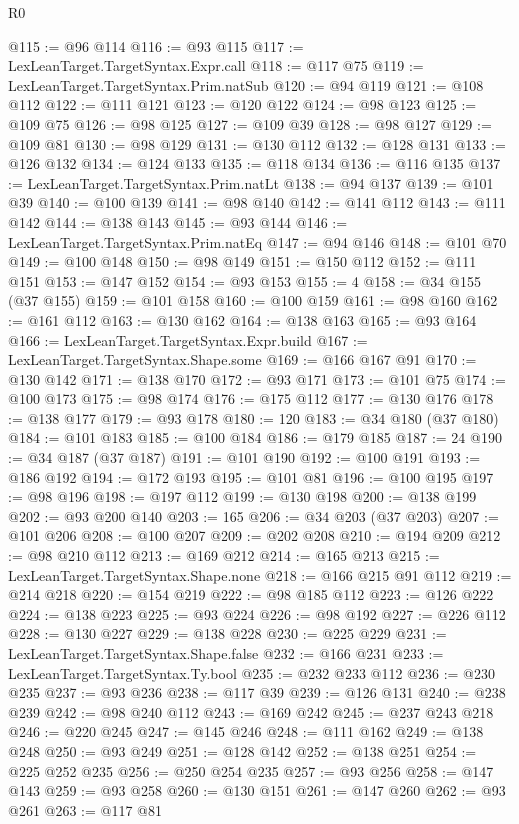 \begin{lexlean}{R0}
\begin{coremodule}
@115 := @96 @114
@116 := @93 @115
@117 := LexLeanTarget.TargetSyntax.Expr.call
@118 := @117 @75
@119 := LexLeanTarget.TargetSyntax.Prim.natSub
@120 := @94 @119
@121 := @108 @112
@122 := @111 @121
@123 := @120 @122
@124 := @98 @123
@125 := @109 @75
@126 := @98 @125
@127 := @109 @39
@128 := @98 @127
@129 := @109 @81
@130 := @98 @129
@131 := @130 @112
@132 := @128 @131
@133 := @126 @132
@134 := @124 @133
@135 := @118 @134
@136 := @116 @135
@137 := LexLeanTarget.TargetSyntax.Prim.natLt
@138 := @94 @137
@139 := @101 @39
@140 := @100 @139
@141 := @98 @140
@142 := @141 @112
@143 := @111 @142
@144 := @138 @143
@145 := @93 @144
@146 := LexLeanTarget.TargetSyntax.Prim.natEq
@147 := @94 @146
@148 := @101 @70
@149 := @100 @148
@150 := @98 @149
@151 := @150 @112
@152 := @111 @151
@153 := @147 @152
@154 := @93 @153
@155 := 4
@158 := @34 @155 (@37 @155)
@159 := @101 @158
@160 := @100 @159
@161 := @98 @160
@162 := @161 @112
@163 := @130 @162
@164 := @138 @163
@165 := @93 @164
@166 := LexLeanTarget.TargetSyntax.Expr.build
@167 := LexLeanTarget.TargetSyntax.Shape.some
@169 := @166 @167 @91
@170 := @130 @142
@171 := @138 @170
@172 := @93 @171
@173 := @101 @75
@174 := @100 @173
@175 := @98 @174
@176 := @175 @112
@177 := @130 @176
@178 := @138 @177
@179 := @93 @178
@180 := 120
@183 := @34 @180 (@37 @180)
@184 := @101 @183
@185 := @100 @184
@186 := @179 @185
@187 := 24
@190 := @34 @187 (@37 @187)
@191 := @101 @190
@192 := @100 @191
@193 := @186 @192
@194 := @172 @193
@195 := @101 @81
@196 := @100 @195
@197 := @98 @196
@198 := @197 @112
@199 := @130 @198
@200 := @138 @199
@202 := @93 @200 @140
@203 := 165
@206 := @34 @203 (@37 @203)
@207 := @101 @206
@208 := @100 @207
@209 := @202 @208
@210 := @194 @209
@212 := @98 @210 @112
@213 := @169 @212
@214 := @165 @213
@215 := LexLeanTarget.TargetSyntax.Shape.none
@218 := @166 @215 @91 @112
@219 := @214 @218
@220 := @154 @219
@222 := @98 @185 @112
@223 := @126 @222
@224 := @138 @223
@225 := @93 @224
@226 := @98 @192
@227 := @226 @112
@228 := @130 @227
@229 := @138 @228
@230 := @225 @229
@231 := LexLeanTarget.TargetSyntax.Shape.false
@232 := @166 @231
@233 := LexLeanTarget.TargetSyntax.Ty.bool
@235 := @232 @233 @112
@236 := @230 @235
@237 := @93 @236
@238 := @117 @39
@239 := @126 @131
@240 := @238 @239
@242 := @98 @240 @112
@243 := @169 @242
@245 := @237 @243 @218
@246 := @220 @245
@247 := @145 @246
@248 := @111 @162
@249 := @138 @248
@250 := @93 @249
@251 := @128 @142
@252 := @138 @251
@254 := @225 @252 @235
@256 := @250 @254 @235
@257 := @93 @256
@258 := @147 @143
@259 := @93 @258
@260 := @130 @151
@261 := @147 @260
@262 := @93 @261
@263 := @117 @81

\end{coremodule}
\end{lexlean}
